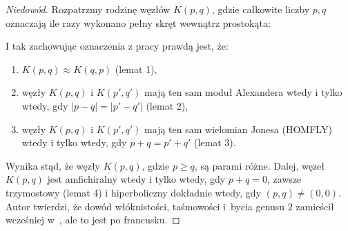 \begin{proof}[Niedowód]
    Rozpatrzmy rodzinę węzłów $K(p, q)$, gdzie całkowite liczby $p, q$ oznaczają ile razy wykonano pełny skręt wewnątrz prostokąta:
\begin{comment}
    \[
        \begin{tikzpicture}[baseline=-0.65ex,scale=0.08]
        \begin{knot}[clip width=5, flip crossing/.list={1,3,6,7}]
        \strand [thick] (0, 25)
            [in=left, out=right] to (20, 25)
            [in=up, out=right] to (25, 5)
            [in=down, out=down] to (15, 5)
            [in=right, out=up] to (10, 20)
            [in=up, out=left] to (5, 15)
            [in=up, out=down] to (5, 5)
            [in=left, out=down] to (15, -10)
        ;
        \strand [thick] (15, -10)
            [in=down, out=right] to (20, 10)
            [in=up, out=up] to (30, 10)
            [in=right, out=down] to (20, -25)
            [in=down, out=left] to (5, -20)
            [in=down, out=up] to (5, -10)
        ;
        \strand [thick] (5, -10)
            [in=down, out=up] to (15, 0)
            [in=right, out=up] to (0, 5)
            [in=up, out=left] to (-15, 0)
            [in=up, out=down] to (-5, -10)
            ;
        \strand [thick] (-15, -10)
            [in=down, out=left] to (-20, 10)
            [in=up, out=up] to (-30, 10)
            [in=left, out=down] to (-20, -25)
            [in=down, out=right] to (-5, -20)
            [in=down, out=up] to (-5, -10)
        ;
        \strand [thick] (0, 25)
            [in=right, out=left] to (-20, 25)
            [in=up, out=left] to (-25, 5)
            [in=down, out=down] to (-15, 5)
            [in=left, out=up] to (-10, 20)
            [in=up, out=right] to (-5, 15)
            [in=up, out=down] to (-5, 5)
            [in=right, out=down] to (-15, -10)
        ;
        \draw[fill=blue!10!white,thick] (-5, 10) rectangle (5, 15);
        \draw[fill=blue!10!white,thick] (-5, -17.5) rectangle (5, -12.5);
        \node at (0, 12.5) {$p$};
        \node at (0, -15) {$q$};
        \end{knot}
        \end{tikzpicture}
    \]
\end{comment}
    I tak zachowując oznaczenia z pracy \cite{kanenobu86} prawdą jest, że:
    \begin{enumerate}
        \item $K(p,q) \approx K(q,p)$ (lemat 1),
        \item węzły $K(p,q)$ i $K(p', q')$ mają ten sam moduł Alexandera wtedy i tylko wtedy, gdy $|p-q| = |p'-q'|$ (lemat 2),
        \item węzły $K(p,q)$ i $K(p', q')$ mają ten sam wielomian Jonesa (HOMFLY) wtedy i tylko wtedy, gdy $p+q = p'+q'$ (lemat 3).
    \end{enumerate}
    Wynika stąd, że węzły $K(p, q)$, gdzie $p \ge q$, są parami różne.
    Dalej, węzeł $K(p,q)$ jest amfichiralny wtedy i tylko wtedy, gdy $p + q = 0$, zawsze trzymostowy (lemat 4) i hiperboliczny dokładnie wtedy, gdy $(p, q) \neq (0, 0)$.
    Autor twierdzi, że dowód włóknistości, taśmowości i~bycia genusu $2$ zamieścił wcześniej w~\cite{kanenobu81}, ale to jest po francusku.
\end{proof}

